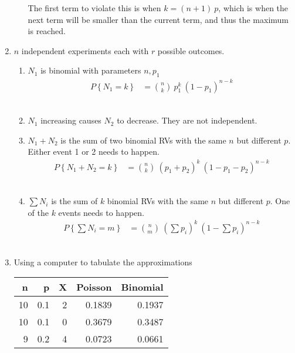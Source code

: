 \begin{enumerate}
\begin{enumerate}
			The first term to violate this is when $ k = (n+1)\ p $, which is when the next term will be smaller than the current term, and thus the maximum is reached.\\
			
		\end{enumerate}
	 
	
	\item $ n $ independent experiments each with $ r $ possible outcomes.\\
	
		\begin{enumerate}
			\item $ N_1 $ is binomial with parameters $ n, p_1 $
			\begin{align}
				P \left\{N_1 = k\right\} &= \binom{n}{k}\ p_1^k\ (1-p_1)^{n-k}
			\end{align}\\
			
			\item $ N_1 $ increasing causes $ N_2 $ to decrease. They are not independent. \\
			
			\item $ N_1 + N_2 $ is the sum of two binomial RVs with the same $ n $ but different $ p $. Either event 1 or 2 needs to happen.\\
			\begin{align}
				P \left\{N_1 + N_2 = k \right\} &= \binom{n}{k}\ (p_1 + p_2)^k\ (1-p_1 - p_2)^{n-k} 
			\end{align}\\
			
			\item $ \sum N_i $ is the sum of $ k $ binomial RVs with the same $ n $ but different $ p $. One of the $ k $ events needs to happen.\\
			\begin{align}
				P \left\{\sum N_i = m \right\} &= \binom{n}{m}\ \left(\sum p_i\right)^k\ \left(1-\sum p_i\right)^{n-k} 
			\end{align}\\
			
		\end{enumerate}
	 
	
	\item Using a computer to tabulate the approximations\\
	
	\begin{table}[H]
		\centering
		\begin{tabular}{@{}rrrrr@{}}
			\toprule
			n &    p &  X &   Poisson &  Binomial \\
			\midrule
			10 &  0.1 &  2 &  0.1839 &    0.1937 \\
			10 &  0.1 &  0 &  0.3679 &    0.3487 \\
			9 &  0.2 &  4 &  0.0723 &    0.0661 \\
		\end{tabular}
	\end{table}
	

\end{enumerate}
